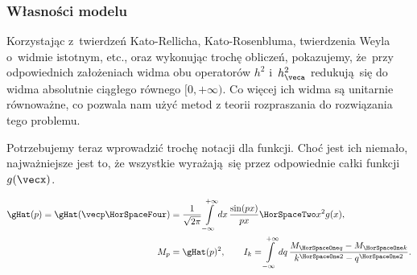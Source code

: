 \documentclass[10pt,t]{beamer}
\begin{document}
\begin{frame}
  \frametitle{Własności modelu}


  Korzystając z~twierdzeń Kato-Rellicha, Kato-Rosenbluma, twierdzenia
  Weyla o~widmie istotnym, etc., oraz wykonując trochę obliczeń, pokazujemy,
  że~przy odpowiednich założeniach widma obu operatorów $h^{ 2 }$
  i~$h_{ \veca }^{ 2 }$ redukują~się do widma absolutnie ciągłego równego
  $[ 0, +\infty )$. Co więcej ich widma są unitarnie równoważne, co pozwala nam
  użyć metod z teorii rozpraszania do rozwiązania tego problemu.

  Potrzebujemy teraz wprowadzić trochę notacji dla funkcji. Choć jest ich
  niemało, najważniejsze jest to, że wszystkie wyrażają~się przez
  odpowiednie całki funkcji $g( \vecx )$.

  \vspace{-1.6em}



  \begin{subequations}

    \begin{align}
      \label{eq:Pole-skalarne-ETC-02-A}
      \gHat( p ) = \gHat( \vecp \HorSpaceFour )
      &=
      \frac{ 1 }{ \sqrt{ 2 \pi } }
      \int\limits_{ -\infty }^{ +\infty } dx \, \frac{ \sin( p x ) }{ p x }
        \HorSpaceTwo x^{ 2 } g( x ), \\
      \label{eq:Pole-skalarne-ETC-02-B}
      M_{ p }
      &= \gHat( p )^{ 2 }, \qquad
        I_{ k } =
        \int\limits_{ -\infty }^{ +\infty } dq \,
        \frac{ M_{ \HorSpaceOne q } - M_{ \HorSpaceOne k } }{
        k^{ \HorSpaceOne 2 } - q^{ \HorSpaceOne 2 } }.
    \end{align}

  \end{subequations}

\end{frame}
\end{document}
